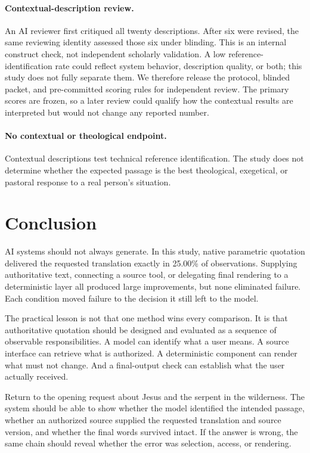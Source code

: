 \documentclass[11pt]{article}
\begin{document}
\paragraph{Contextual-description review.}
An AI reviewer first critiqued all twenty descriptions. After six were revised,
the same reviewing identity assessed those six under blinding. This is an
internal construct check, not independent scholarly validation. A low
reference-identification rate could reflect system behavior, description
quality, or both; this study does not fully separate them. We therefore release
the protocol, blinded packet, and pre-committed scoring rules for independent
review. The primary scores are frozen, so a later review could qualify how the
contextual results are interpreted but would not change any reported number.

\paragraph{No contextual or theological endpoint.}
Contextual descriptions test technical reference identification. The study
does not determine whether the expected passage is the best theological,
exegetical, or pastoral response to a real person's situation.

\section{Conclusion}
\label{sec:conclusion}

AI systems should not always generate. In this study, native parametric
quotation delivered the requested translation exactly in 25.00\% of observations.
Supplying authoritative text, connecting a source tool, or delegating final
rendering to a deterministic layer all produced large improvements, but none
eliminated failure. Each condition moved failure to the decision it still
left to the model.

The practical lesson is not that one method wins every comparison. It is that
authoritative quotation should be designed and evaluated as a sequence of
observable responsibilities. A model can identify what a user
means. A source interface can retrieve what is authorized. A deterministic
component can render what must not change. And a final-output check can
establish what the user actually received.

Return to the opening request about Jesus and the serpent in the wilderness.
The system should be able to show whether the model identified the intended
passage, whether an authorized source supplied the requested translation and
source version, and
whether the final words survived intact. If the answer is wrong, the same
chain should reveal whether the error was selection, access, or rendering.
\end{document}
